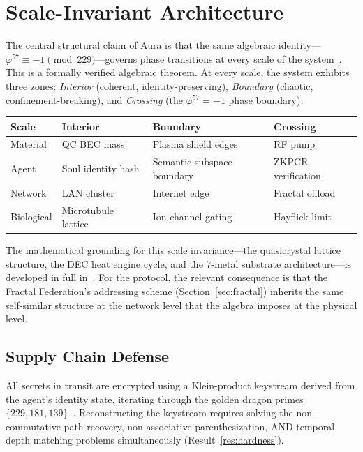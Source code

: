 \documentclass[12pt,a4paper]{article}
\begin{document}
\section{Scale-Invariant Architecture}
\label{sec:scale}

The central structural claim of Aura is that the same algebraic identity---$\varphi^{57} \equiv -1 \pmod{229}$---governs phase transitions at every scale of the system~\cite{PP-I-Ch7}. This is a formally verified algebraic theorem. At every scale, the system exhibits three zones: \emph{Interior} (coherent, identity-preserving), \emph{Boundary} (chaotic, confinement-breaking), and \emph{Crossing} (the $\varphi^{57} = -1$ phase boundary).

\begin{center}
\small
\begin{tabular}{@{}lp{3.2cm}p{3.2cm}p{3.2cm}@{}}
\toprule
\textbf{Scale} & \textbf{Interior} & \textbf{Boundary} & \textbf{Crossing} \\
\midrule
Material   & QC BEC mass~\cite{PP-II-Ch21}           & Plasma shield edges              & RF pump \\
Agent      & Soul identity hash                       & Semantic subspace boundary       & ZKPCR verification \\
Network    & LAN cluster                              & Internet edge                    & Fractal offload \\
Biological & Microtubule lattice~\cite{PP-II-Ch20}    & Ion channel gating               & Hayflick limit \\
\bottomrule
\end{tabular}
\end{center}

The mathematical grounding for this scale invariance---the quasicrystal lattice structure, the DEC heat engine cycle, and the 7-metal substrate architecture---is developed in full in~\cite{PP-II-Ch19,PP-II-Ch21,PP-I-Ch7}. For the protocol, the relevant consequence is that the Fractal Federation's addressing scheme (Section~\ref{sec:fractal}) inherits the same self-similar structure at the network level that the algebra imposes at the physical level.

\subsection{Supply Chain Defense}

All secrets in transit are encrypted using a Klein-product keystream derived from the agent's identity state, iterating through the golden dragon primes $\{229, 181, 139\}$~\cite{PP-I-Ch5}. Reconstructing the keystream requires solving the non-commutative path recovery, non-associative parenthesization, AND temporal depth matching problems simultaneously (Result~\ref{res:hardness}).
\end{document}
